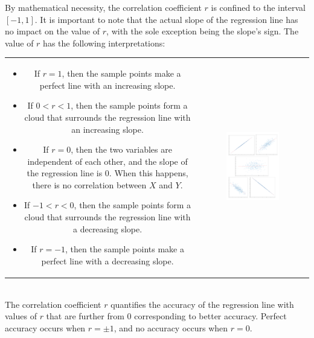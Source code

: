 \documentclass{article}
\begin{document}
By mathematical necessity, the correlation coefficient \(r\) is confined to the interval \([-1, 1]\). It is important to note that the actual slope of the regression line has no impact on the value of \(r\), with the sole exception being the slope's sign. The value of \(r\) has the following interpretations: \\
\begin{tabular}{cc}
\parbox{0.5\textwidth}{
\begin{itemize}
\item If \(r = 1\), then the sample points make a perfect line with an increasing slope. 
\item If \(0 < r < 1\), then the sample points form a cloud that surrounds the regression line with an increasing slope. 
\item If \(r = 0\), then the two variables are independent of each other, and the slope of the regression line is \(0\). When this happens, there is no correlation between \(X\) and \(Y\). 
\item If \(-1 < r < 0\), then the sample points form a cloud that surrounds the regression line with a decreasing slope. 
\item If \(r = -1\), then the sample points make a perfect line with a decreasing slope. 
\end{itemize}
} & \parbox{0.5\textwidth}{
\includegraphics[width = 0.5\textwidth]{correlation_coefficient_scenarios}
}
\end{tabular} \\
The correlation coefficient \(r\) quantifies the accuracy of the regression line with values of \(r\) that are further from \(0\) corresponding to better accuracy. Perfect accuracy occurs when \(r = \pm 1\), and no accuracy occurs when \(r = 0\).
\end{document}
